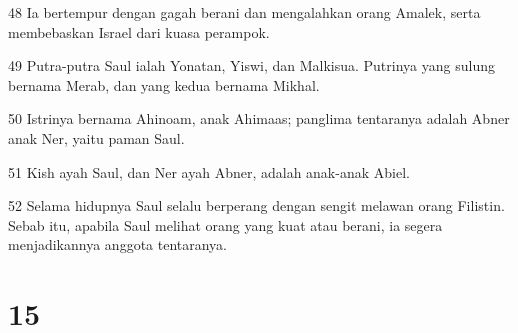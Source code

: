 \par 48 Ia bertempur dengan gagah berani dan mengalahkan orang Amalek, serta membebaskan Israel dari kuasa perampok.
\par 49 Putra-putra Saul ialah Yonatan, Yiswi, dan Malkisua. Putrinya yang sulung bernama Merab, dan yang kedua bernama Mikhal.
\par 50 Istrinya bernama Ahinoam, anak Ahimaas; panglima tentaranya adalah Abner anak Ner, yaitu paman Saul.
\par 51 Kish ayah Saul, dan Ner ayah Abner, adalah anak-anak Abiel.
\par 52 Selama hidupnya Saul selalu berperang dengan sengit melawan orang Filistin. Sebab itu, apabila Saul melihat orang yang kuat atau berani, ia segera menjadikannya anggota tentaranya.

\chapter{15}


